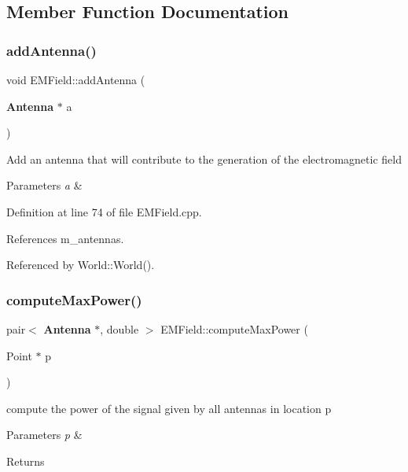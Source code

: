 \subsection{Member Function Documentation}
\mbox{\label{class_e_m_field_ac531ecbce4c81aa5da19fe3c734a585c}} 
\subsubsection{add\+Antenna()}
{\footnotesize\ttfamily void E\+M\+Field\+::add\+Antenna (\begin{DoxyParamCaption}\item[{\textbf{ Antenna} $\ast$}]{a }\end{DoxyParamCaption})}

Add an antenna that will contribute to the generation of the electromagnetic field 
\begin{DoxyParams}{Parameters}
{\em a} & \\
\hline
\end{DoxyParams}


Definition at line 74 of file E\+M\+Field.\+cpp.



References m\+\_\+antennas.



Referenced by World\+::\+World().

\mbox{\label{class_e_m_field_adeed63c6ce6d5cf922a884abf731e601}} 
\subsubsection{compute\+Max\+Power()}
{\footnotesize\ttfamily pair$<$ \textbf{ Antenna} $\ast$, double $>$ E\+M\+Field\+::compute\+Max\+Power (\begin{DoxyParamCaption}\item[{Point $\ast$}]{p }\end{DoxyParamCaption})}

compute the power of the signal given by all antennas in location p 
\begin{DoxyParams}{Parameters}
{\em p} & \\
\hline
\end{DoxyParams}
\begin{DoxyReturn}{Returns}

\end{DoxyReturn}


